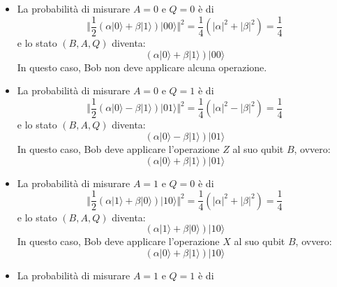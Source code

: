 \begin{itemize}
    \item La probabilità di misurare $A = 0$ e $Q = 0$ è di
            \begin{equation*}
                \Vert \frac{1}{2}\left(\alpha |0\rangle + \beta |1\rangle\right)|00\rangle \Vert^2 = \frac{1}{4}\left(|\alpha|^2 + |\beta|^2\right) = \frac{1}{4}
            \end{equation*}
        e lo stato $(B,A,Q)$ diventa:
        \begin{equation*}
            \left(\alpha |0\rangle + \beta |1\rangle\right)|00\rangle
        \end{equation*}
        In questo caso, Bob non deve applicare alcuna operazione.
    \item La probabilità di misurare $A = 0$ e $Q = 1$ è di
    \begin{equation*}
        \Vert \frac{1}{2}\left(\alpha |0\rangle - \beta |1\rangle\right)|01\rangle \Vert^2 = \frac{1}{4}\left(|\alpha|^2 - |\beta|^2\right) = \frac{1}{4}
    \end{equation*}
    e lo stato $(B,A,Q)$ diventa:
    \begin{equation*}
        \left(\alpha |0\rangle - \beta |1\rangle\right)|01\rangle
    \end{equation*}
    In questo caso, Bob deve applicare l'operazione $Z$ al suo qubit $B$, ovvero:
    \begin{equation*}
        \left(\alpha |0\rangle + \beta |1\rangle\right)|01\rangle
    \end{equation*}
    \item La probabilità di misurare $A = 1$ e $Q = 0$ è di
        \begin{equation*}
            \Vert \frac{1}{2}\left(\alpha |1\rangle + \beta |0\rangle\right)|10\rangle \Vert^2 = \frac{1}{4}\left(|\alpha|^2 + |\beta|^2\right) = \frac{1}{4}
        \end{equation*}
        e lo stato $(B,A,Q)$ diventa:
        \begin{equation*}
            \left(\alpha |1\rangle + \beta |0\rangle\right)|10\rangle
        \end{equation*}
        In questo caso, Bob deve applicare l'operazione $X$ al suo qubit $B$, ovvero:
        \begin{equation*}
            \left(\alpha |0\rangle + \beta |1\rangle\right)|10\rangle
        \end{equation*}
    \item La probabilità di misurare $A = 1$ e $Q = 1$ è di

\end{itemize}
